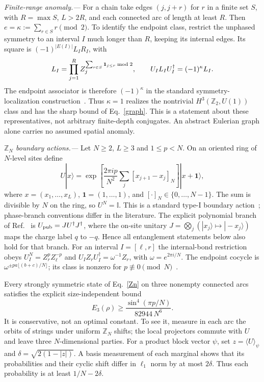 \documentclass[aps,prl,reprint,nofootinbib]{revtex4-2}
\newcommand{\Id}{\mathbb I}
\begin{document}
\emph{Finite-range anomaly.---} For a chain take edges $(j,j+r)$ for
$r$ in a finite set $S$, with $R=\max S$, $L>2R$, and each connected arc
of length at least $R$. Then $e=\kappa:=\sum_{r\in S}r\pmod2$. To
identify the endpoint class, restrict the unphased symmetry to an interval
$I$ much longer than $R$, keeping its internal edges. Its square is
$(-1)^{|E(I)|}L_I R_I$, with
\begin{equation}
 L_I=\prod_{j=1}^R Z_j^{\sum_{r\in S}{\bf1}_{j\le r}\bmod2},
 \qquad U_IL_IU_I^\dagger=(-1)^\kappa L_I .
 \label{endpoint}
\end{equation}
The endpoint associator is therefore $(-1)^\kappa$ in the standard
symmetry-localization construction~\cite{Else,LCW}. Thus $\kappa=1$
realizes the nontrivial $H^3(\mathbb Z_2,U(1))$ class and has the sharp
bound of Eq.~\eqref{graph}. This is a statement about these
representatives, not arbitrary finite-depth conjugates. An abstract
Eulerian graph alone carries no assumed spatial anomaly.

\emph{$\mathbb Z_N$ boundary actions.---} Let $N\ge2$, $L\ge3$ and
$1\le p<N$. On an oriented ring of $N$-level sites define
\begin{equation}
 U|x\rangle
 =\exp\!\left[\frac{2\pi ip}{N^2}
     \sum_j[x_{j+1}-x_j]_N\right]|x+\mathbf 1\rangle,
 \label{Zn}
\end{equation}
where $x=(x_1,\ldots,x_L)$, $\mathbf 1=(1,\ldots,1)$, and
$[\cdot]_N\in\{0,\ldots,N-1\}$. The sum is divisible by $N$ on
the ring, so $U^N=\Id$. This is a standard type-I boundary
action~\cite{Santos,Wang}; phase-branch conventions differ in the
literature. The explicit polynomial branch of Ref.~\cite{Wang} is
$U_{\rm pub}=J U^\dagger J^\dagger$, where the on-site unitary
$J=\bigotimes_j(|x_j\rangle\mapsto|-x_j\rangle)$ maps the charge label
$q$ to $-q$. Hence all entanglement statements below also hold for that
branch.
For an interval $I=[\ell,r]$ the internal-bond restriction obeys
$U_I^N=Z_r^p Z_\ell^{-p}$ and
$U_IZ_rU_I^\dagger=\omega^{-1}Z_r$, with $\omega=e^{2\pi i/N}$.
The endpoint cocycle is $\omega^{\pm p a\lfloor(b+c)/N\rfloor}$;
its class is nonzero for $p\not\equiv0\pmod N$~\cite{Else,Wang}.

Every strongly symmetric state of Eq.~\eqref{Zn} on three nonempty
connected arcs satisfies the explicit size-independent bound
\begin{equation}
 E_3(\rho)\ge\frac{\sin^4(\pi p/N)}{82944\,N^6}.
 \label{ZnE3}
\end{equation}
It is conservative, not an optimal constant. To see it, measure in each
arc the orbits of strings under uniform $\mathbb Z_N$ shifts; the local
projectors commute with $U$ and leave three $N$-dimensional parties.
For a product block vector $\psi$, set $z=\langle U\rangle_\psi$ and
$\delta=\sqrt{2(1-|z|)}$. A basis measurement of each marginal shows
that its probabilities and their cyclic shift differ in $\ell_1$ norm by
at most $2\delta$. Thus each probability is at least $1/N-2\delta$.
\end{document}
